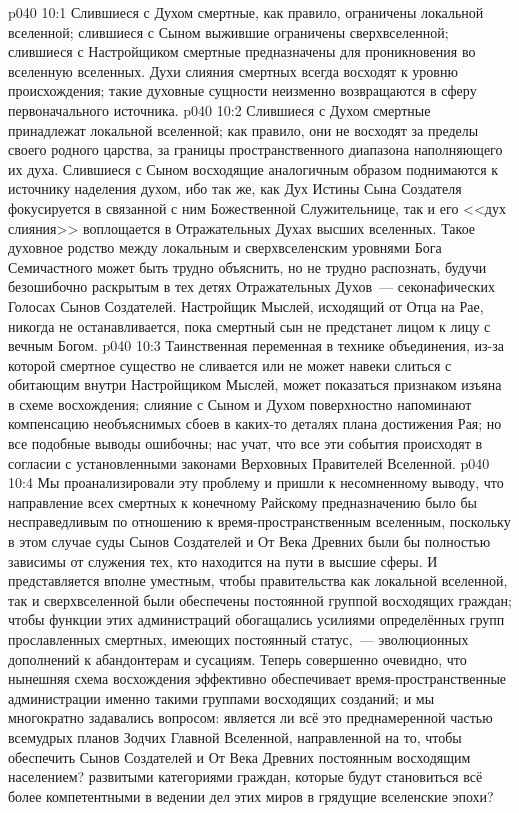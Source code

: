 \vs p040 10:1 Слившиеся с Духом смертные, как правило, ограничены локальной вселенной; слившиеся с Сыном выжившие ограничены сверхвселенной; слившиеся с Настройщиком смертные предназначены для проникновения во вселенную вселенных. Духи слияния смертных всегда восходят к уровню происхождения; такие духовные сущности неизменно возвращаются в сферу первоначального источника.
\vs p040 10:2 Слившиеся с Духом смертные принадлежат локальной вселенной; как правило, они не восходят за пределы своего родного царства, за границы пространственного диапазона наполняющего их духа. Слившиеся с Сыном восходящие аналогичным образом поднимаются к источнику наделения духом, ибо так же, как Дух Истины Сына Создателя фокусируется в связанной с ним Божественной Служительнице, так и его <<дух слияния>> воплощается в Отражательных Духах высших вселенных. Такое духовное родство между локальным и сверхвселенским уровнями Бога Семичастного может быть трудно объяснить, но не трудно распознать, будучи безошибочно раскрытым в тех детях Отражательных Духов~--- секонафических Голосах Сынов Создателей. Настройщик Мыслей, исходящий от Отца на Рае, никогда не останавливается, пока смертный сын не предстанет лицом к лицу с вечным Богом.
\vs p040 10:3 \pc Таинственная переменная в технике объединения, из-за которой смертное существо не сливается или не может навеки слиться с обитающим внутри Настройщиком Мыслей, может показаться признаком изъяна в схеме восхождения; слияние с Сыном и Духом поверхностно напоминают компенсацию необъяснимых сбоев в каких-то деталях плана достижения Рая; но все подобные выводы ошибочны; нас учат, что все эти события происходят в согласии с установленными законами Верховных Правителей Вселенной.
\vs p040 10:4 Мы проанализировали эту проблему и пришли к несомненному выводу, что направление всех смертных к конечному Райскому предназначению было бы несправедливым по отношению к время\hyp{}пространственным вселенным, поскольку в этом случае суды Сынов Создателей и От Века Древних были бы полностью зависимы от служения тех, кто находится на пути в высшие сферы. И представляется вполне уместным, чтобы правительства как локальной вселенной, так и сверхвселенной были обеспечены постоянной группой восходящих граждан; чтобы функции этих администраций обогащались усилиями определённых групп прославленных смертных, имеющих постоянный статус,~--- эволюционных дополнений к абандонтерам и сусациям. Теперь совершенно очевидно, что нынешняя схема восхождения эффективно обеспечивает время\hyp{}пространственные администрации именно такими группами восходящих созданий; и мы многократно задавались вопросом: является ли всё это преднамеренной частью всемудрых планов Зодчих Главной Вселенной, направленной на то, чтобы обеспечить Сынов Создателей и От Века Древних постоянным восходящим населением? развитыми категориями граждан, которые будут становиться всё более компетентными в ведении дел этих миров в грядущие вселенские эпохи?
